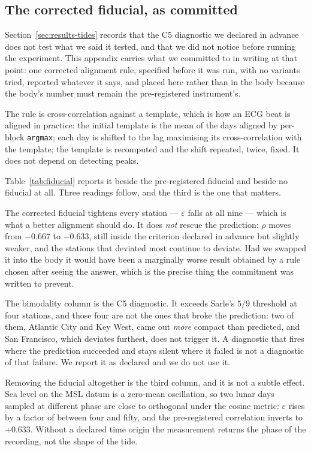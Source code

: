 \documentclass[10pt]{article}
\theoremstyle{plain}
\theoremstyle{definition}
\theoremstyle{remark}
\begin{document}
\subsection{The corrected fiducial, as committed}
\label{app:tides-fiducial}

Section~\ref{sec:results-tides} records that the C5 diagnostic we declared in
advance does not test what we said it tested, and that we did not notice before
running the experiment. This appendix carries what we committed to in writing at
that point: one corrected alignment rule, specified before it was run, with no
variants tried, reported whatever it says, and placed here rather than in the
body because the body's number must remain the pre-registered instrument's.

The rule is cross-correlation against a template, which is how an ECG beat is
aligned in practice: the initial template is the mean of the days aligned by
per-block \texttt{argmax}; each day is shifted to the lag maximising its
cross-correlation with the template; the template is recomputed and the shift
repeated, twice, fixed. It does not depend on detecting peaks.

Table~\ref{tab:fiducial} reports it beside the pre-registered fiducial and beside
no fiducial at all. Three readings follow, and the third is the one that matters.

The corrected fiducial tightens every station --- $\varepsilon$ falls at all nine
--- which is what a better alignment should do. It does \emph{not} rescue the
prediction: $\rho$ moves from $-0.667$ to $-0.633$, still inside the criterion
declared in advance but slightly weaker, and the stations that deviated most
continue to deviate. Had we swapped it into the body it would have been a
marginally worse result obtained by a rule chosen after seeing the answer, which
is the precise thing the commitment was written to prevent.

The bimodality column is the C5 diagnostic. It exceeds Sarle's $5/9$ threshold at
four stations, and those four are not the ones that broke the prediction: two of
them, Atlantic City and Key West, came out \emph{more} compact than predicted,
and San Francisco, which deviates furthest, does not trigger it. A diagnostic
that fires where the prediction succeeded and stays silent where it failed is not
a diagnostic of that failure. We report it as declared and we do not use it.

Removing the fiducial altogether is the third column, and it is not a subtle
effect. Sea level on the MSL datum is a zero-mean oscillation, so two lunar days
sampled at different phase are close to orthogonal under the cosine metric:
$\varepsilon$ rises by a factor of between four and fifty, and the
pre-registered correlation inverts to $+0.633$. Without a declared time origin the measurement
returns the phase of the recording, not the shape of the tide.
\end{document}
